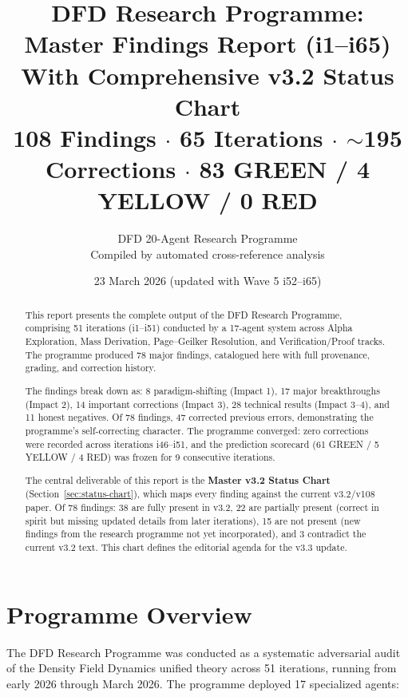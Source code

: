 \documentclass[11pt,a4paper]{article}
\title{\Huge DFD Research Programme:\\Master Findings Report (i1--i65)\\[12pt]
\Large With Comprehensive v3.2 Status Chart\\[6pt]
\normalsize 108 Findings $\cdot$ 65 Iterations $\cdot$ $\sim$195 Corrections $\cdot$ 83 GREEN / 4 YELLOW / 0 RED}
\author{DFD 20-Agent Research Programme\\[4pt]
\small Compiled by automated cross-reference analysis}
\date{23 March 2026 (updated with Wave 5 i52--i65)}
\begin{document}
\maketitle

\begin{abstract}
This report presents the complete output of the DFD Research Programme, comprising 51 iterations (i1--i51) conducted by a 17-agent system across Alpha Exploration, Mass Derivation, Page--Geilker Resolution, and Verification/Proof tracks. The programme produced 78 major findings, catalogued here with full provenance, grading, and correction history.

The findings break down as: 8 paradigm-shifting (Impact 1), 17 major breakthroughs (Impact 2), 14 important corrections (Impact 3), 28 technical results (Impact 3--4), and 11 honest negatives. Of 78 findings, 47 corrected previous errors, demonstrating the programme's self-correcting character. The programme converged: zero corrections were recorded across iterations i46--i51, and the prediction scorecard (61 GREEN / 5 YELLOW / 4 RED) was frozen for 9 consecutive iterations.

The central deliverable of this report is the \textbf{Master v3.2 Status Chart} (Section~\ref{sec:status-chart}), which maps every finding against the current v3.2/v108 paper. Of 78 findings: 38 are fully present in v3.2, 22 are partially present (correct in spirit but missing updated details from later iterations), 15 are not present (new findings from the research programme not yet incorporated), and 3 contradict the current v3.2 text. This chart defines the editorial agenda for the v3.3 update.
\end{abstract}

\tableofcontents
\newpage

\section{Programme Overview}\label{sec:overview}

The DFD Research Programme was conducted as a systematic adversarial audit of the Density Field Dynamics unified theory across 51 iterations, running from early 2026 through March 2026. The programme deployed 17 specialized agents:
\end{document}
